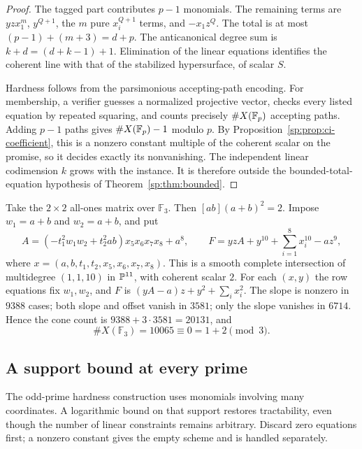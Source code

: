 \begin{proof}
The tagged part contributes $p-1$ monomials. The remaining terms are
$yzx_1^m$, $y^{Q+1}$, the $m$ pure $x_i^{Q+1}$ terms, and $-x_1z^Q$.
The total is at most $(p-1)+(m+3)=d+p$.
The anticanonical degree sum is $k+d=(d+k-1)+1$.
Elimination of the linear equations identifies the coherent line with
that of the stabilized hypersurface, of scalar $S$.

Hardness follows from the parsimonious accepting-path encoding.
For membership, a verifier guesses a normalized projective vector,
checks every listed equation by repeated squaring, and counts precisely
$\#X(\mathbb F_p)$ accepting paths. Adding $p-1$ paths gives
$\#X(\mathbb F_p)-1$ modulo $p$. By
Proposition~\ref{sp:prop:ci-coefficient}, this is a nonzero constant
multiple of the coherent scalar on the promise, so it decides exactly
its nonvanishing. The independent linear codimension $k$ grows with
the instance. It is therefore outside the bounded-total-equation
hypothesis of Theorem~\ref{sp:thm:bounded}.
\end{proof}

\begin{example}
\label{sp:ex:permanent}
Take the $2\times2$ all-ones matrix over $\mathbb F_3$.
Then $[ab](a+b)^2=2$. Impose $w_1=a+b$ and $w_2=a+b$, and put
\[
 A=(-t_1^2w_1w_2+t_2^2ab)x_5x_6x_7x_8+a^8,
 \qquad
 F=yzA+y^{10}+\sum_{i=1}^8x_i^{10}-az^9,
\]
where $x=(a,b,t_1,t_2,x_5,x_6,x_7,x_8)$.
This is a smooth complete intersection of multidegree $(1,1,10)$ in
$\mathbb P^{11}$, with coherent scalar $2$.
For each $(x,y)$ the row equations fix $w_1,w_2$, and $F$ is
$(yA-a)z+y^2+\sum_i x_i^2$. The slope is nonzero in $9388$ cases;
both slope and offset vanish in $3581$; only the slope vanishes in
$6714$. Hence the cone count is $9388+3\cdot3581=20131$, and
\[
 \#X(\mathbb F_3)=10065\equiv0=1+2\pmod3.
\]
\end{example}

\subsection{A support bound at every prime}
The odd-prime hardness construction uses monomials involving many
coordinates. A logarithmic bound on that support restores tractability,
even though the number of linear constraints remains arbitrary.
Discard zero equations first; a nonzero constant gives the empty
scheme and is handled separately.

